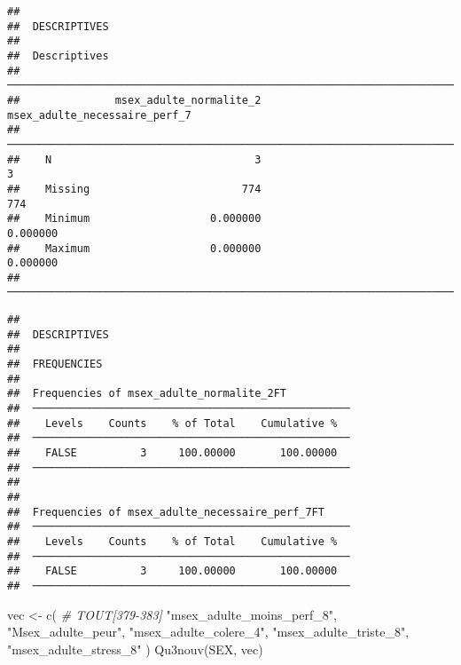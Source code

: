 \documentclass[
]{article}
\newenvironment{Shaded}{\begin{snugshade}}{\end{snugshade}}
\newcommand{\CommentTok}[1]{\textcolor[rgb]{0.56,0.35,0.01}{\textit{#1}}}
\newcommand{\FunctionTok}[1]{\textcolor[rgb]{0.00,0.00,0.00}{#1}}
\newcommand{\NormalTok}[1]{#1}
\newcommand{\OtherTok}[1]{\textcolor[rgb]{0.56,0.35,0.01}{#1}}
\newcommand{\StringTok}[1]{\textcolor[rgb]{0.31,0.60,0.02}{#1}}
\begin{document}
\begin{verbatim}
## 
##  DESCRIPTIVES
## 
##  Descriptives                                                            
##  ─────────────────────────────────────────────────────────────────────── 
##               msex_adulte_normalite_2    msex_adulte_necessaire_perf_7   
##  ─────────────────────────────────────────────────────────────────────── 
##    N                                3                                3   
##    Missing                        774                              774   
##    Minimum                   0.000000                         0.000000   
##    Maximum                   0.000000                         0.000000   
##  ───────────────────────────────────────────────────────────────────────
\end{verbatim}

\begin{verbatim}
## 
##  DESCRIPTIVES
## 
##  FREQUENCIES
## 
##  Frequencies of msex_adulte_normalite_2FT           
##  ────────────────────────────────────────────────── 
##    Levels    Counts    % of Total    Cumulative %   
##  ────────────────────────────────────────────────── 
##    FALSE          3     100.00000       100.00000   
##  ────────────────────────────────────────────────── 
## 
## 
##  Frequencies of msex_adulte_necessaire_perf_7FT     
##  ────────────────────────────────────────────────── 
##    Levels    Counts    % of Total    Cumulative %   
##  ────────────────────────────────────────────────── 
##    FALSE          3     100.00000       100.00000   
##  ──────────────────────────────────────────────────
\end{verbatim}

\begin{Shaded}
\begin{Highlighting}[]
\NormalTok{vec }\OtherTok{\textless{}{-}} \FunctionTok{c}\NormalTok{(  }\CommentTok{\# TOUT[379{-}383]}
  \StringTok{"msex\_adulte\_moins\_perf\_8"}\NormalTok{, }\StringTok{"Msex\_adulte\_peur"}\NormalTok{,                                    }
  \StringTok{"msex\_adulte\_colere\_4"}\NormalTok{, }\StringTok{"msex\_adulte\_triste\_8"}\NormalTok{,                                }
  \StringTok{"msex\_adulte\_stress\_8"}                            
\NormalTok{  )}
\FunctionTok{Qu3nouv}\NormalTok{(SEX, vec)}
\end{Highlighting}
\end{Shaded}
\end{document}
